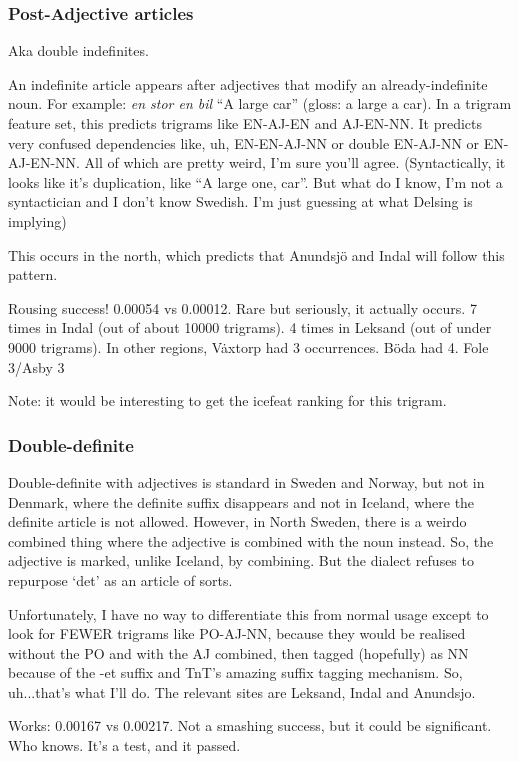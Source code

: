 \subsubsection{Post-Adjective articles}

Aka double indefinites.

An indefinite article appears after adjectives that modify an
already-indefinite noun. For example: {\it en stor en bil} ``A large
car'' (gloss: a large a car). In a trigram feature set, this predicts
trigrams like EN-AJ-EN and AJ-EN-NN. It predicts very confused
dependencies like, uh, EN-EN-AJ-NN or double EN-AJ-NN or
EN-AJ-EN-NN. All of which are pretty weird, I'm sure you'll
agree. (Syntactically, it looks like it's duplication, like ``A large
one, car''. But what do I know, I'm not a syntactician and I don't
know Swedish. I'm just guessing at what Delsing is implying)

This occurs in the north, which predicts that Anundsj\"o and Indal
will follow this pattern.

Rousing success! 0.00054 vs 0.00012. Rare but seriously, it actually
occurs. 7 times in Indal (out of about 10000 trigrams). 4 times in
Leksand (out of under 9000 trigrams). In other regions, V\.axtorp had
3 occurrences. B\"oda had 4. Fole 3/Asby 3

Note: it would be interesting to get the icefeat ranking for this trigram.

\subsubsection{Double-definite}

Double-definite with adjectives is standard in Sweden and Norway, but
not in Denmark, where the definite suffix disappears and not in
Iceland, where the definite article is not allowed. However, in North
Sweden, there is a weirdo combined thing where the adjective is
combined with the noun instead. So, the adjective is marked, unlike
Iceland, by combining. But the dialect refuses to repurpose `det' as
an article of sorts.

Unfortunately, I have no way to differentiate this from normal usage
except to look for FEWER trigrams like PO-AJ-NN, because they would be
realised without the PO and with the AJ combined, then tagged
(hopefully) as NN because of the -et suffix and TnT's amazing suffix
tagging mechanism. So, uh...that's what I'll do. The relevant sites
are Leksand, Indal and Anundsjo.

Works: 0.00167 vs 0.00217. Not a smashing success, but it could be
significant. Who knows. It's a test, and it passed.

